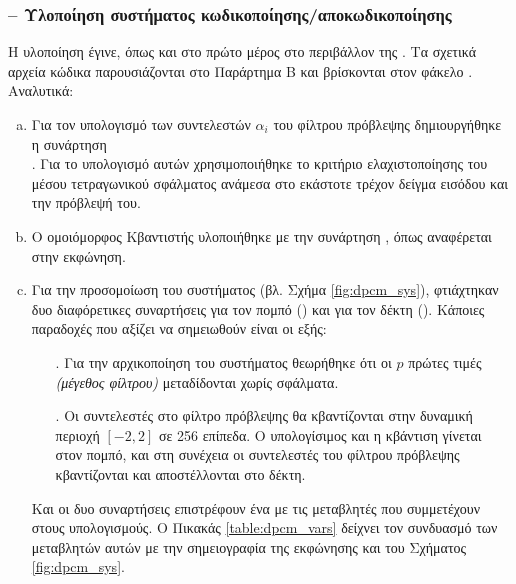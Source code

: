 \documentclass[a4paper]{article}
\newcommand{\code}[1]{\texttt{\texten{#1}}}
\newcommand{\dpcm}{\textit{\texten{DPCM }}}
\newcommand{\matl}{\code{MATLAB }}
\begin{document}
    \subsubsection*{--  Υλοποίηση συστήματος κωδικοποίησης/αποκωδικοποίησης \dpcm}
        Η υλοποίηση έγινε, όπως και στο πρώτο μέρος στο περιβάλλον της \matl. Τα σχετικά αρχεία κώδικα 
        παρουσιάζονται στο Παράρτημα B και βρίσκονται στον φάκελο \texttt{}.
        Αναλυτικά:
        \begin{enumerate}[(a)]
            \item Για τον υπολογισμό των συντελεστών $\alpha_i$ του φίλτρου πρόβλεψης δημιουργήθηκε η συνάρτηση  
            \\ \texttt{}. Για το υπολογισμό αυτών χρησιμοποιήθηκε το κριτήριο 
            ελαχιστοποίησης του μέσου τετραγωνικού σφάλματος ανάμεσα στο εκάστοτε τρέχον δείγμα εισόδου και την 
            πρόβλεψή του. 
            \item Ο ομοιόμορφος Κβαντιστής υλοποιήθηκε με την συνάρτηση  
            \texttt{}, όπως  αναφέρεται στην εκφώνηση.
            \item Για την προσομοίωση του \dpcm συστήματος (βλ. Σχήμα \ref{fig:dpcm_sys}), φτιάχτηκαν
            δυο διαφόρετικες συναρτήσεις για τον πομπό (\texttt{}) και για 
            τον δέκτη (\texttt{}). Κάποιες παραδοχές που αξίζει να σημειωθούν 
            είναι οι εξής:
            \begin{itemize}
                \item[\texten{i}.] Για την αρχικοποίηση του συστήματος θεωρήθηκε ότι οι $p$ πρώτες 
                τιμές \textit{(μέγεθος φίλτρου)} μεταδίδονται χωρίς σφάλματα.
                \item[\texten{ii}.] Οι συντελεστές στο φίλτρο πρόβλεψης θα κβαντίζονται στην 
                δυναμική περιοχή $[-2,2]$ σε 256 επίπεδα. O υπολογίσιμος και η κβάντιση γίνεται στον 
                πομπό, και στη συνέχεια οι συντελεστές του φίλτρου πρόβλεψης κβαντίζονται και 
                αποστέλλονται στο δέκτη.
            \end{itemize}
            Και οι δυο συναρτήσεις επιστρέφουν ένα \texttt{} με τις μεταβλητές που 
            συμμετέχουν στους υπολογισμούς. Ο Πικακάς \ref{table:dpcm_vars} δείχνει τον συνδυασμό των
            μεταβλητών αυτών με την σημειογραφία της εκφώνησης και του Σχήματος \ref{fig:dpcm_sys}.
            \begin{table}[h!]

\end{table}
\end{enumerate}
\end{document}
